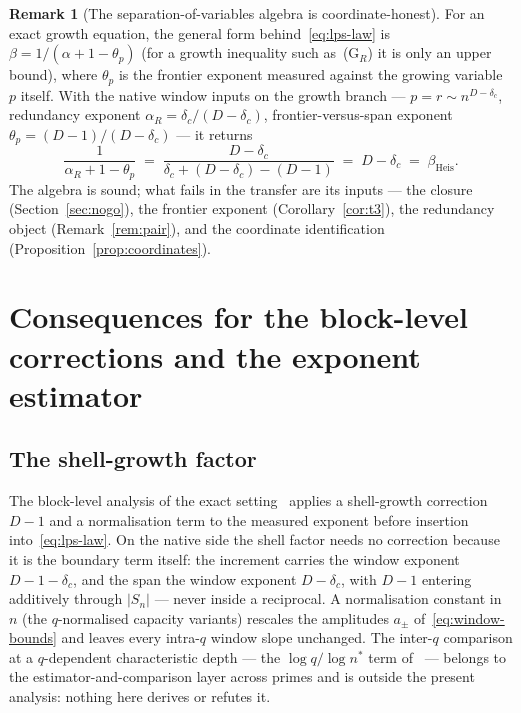 \documentclass[11pt,a4paper]{article}
\theoremstyle{definition}
\newtheorem{remark}[theorem]{Remark}
\newcommand{\dc}{\delta_c}
\begin{document}
\begin{remark}[The separation-of-variables algebra is coordinate-honest]
  \label{rem:selfconsistency}
  For an exact growth equation, the general form behind~\eqref{eq:lps-law} is $\beta = 1/(\alpha + 1 - \theta_p)$
  (for a growth inequality such as~(G$_R$) it is only an upper bound), where $\theta_p$ is
  the frontier exponent measured against the growing variable $p$ itself.
  With the native window inputs on the growth branch --- $p = r \sim n^{D-\dc}$, redundancy exponent
  $\alpha_R = \dc/(D-\dc)$, frontier-versus-span exponent $\theta_p = (D-1)/(D-\dc)$ --- it returns
  \[
    \frac{1}{\alpha_R + 1 - \theta_p}
    \;=\; \frac{D-\dc}{\dc + (D-\dc) - (D-1)}
    \;=\; D - \dc
    \;=\; \beta_{\mathrm{Heis}} .
  \]
  The algebra is sound; what fails in the transfer are its inputs --- the closure
  (Section~\ref{sec:nogo}), the frontier exponent (Corollary~\ref{cor:t3}), the redundancy object
  (Remark~\ref{rem:pair}), and the coordinate identification (Proposition~\ref{prop:coordinates}).
\end{remark}

\section{Consequences for the block-level corrections and the exponent estimator}
\label{sec:o14}

\subsection{The shell-growth factor}
\label{ssec:shell-factor}

The block-level analysis of the exact setting~\cite{Beau2026a18,Beau2026a19} applies a shell-growth
correction $D - 1$ and a normalisation term to the measured exponent before insertion
into~\eqref{eq:lps-law}.
On the native side the shell factor needs no correction because it is the boundary term itself: the
increment carries the window exponent $D - 1 - \dc$, and the span the window exponent $D - \dc$, with
$D - 1$ entering additively through $|S_n|$ --- never inside a reciprocal.
A normalisation constant in $n$ (the $q$-normalised capacity variants) rescales the amplitudes $a_\pm$
of~\eqref{eq:window-bounds} and leaves every intra-$q$ window slope unchanged.
The inter-$q$ comparison at a $q$-dependent characteristic depth --- the $\log q / \log n^*$ term
of~\cite{Beau2026a18} --- belongs to the estimator-and-comparison layer across primes and is outside the
present analysis: nothing here derives or refutes it.
\end{document}
